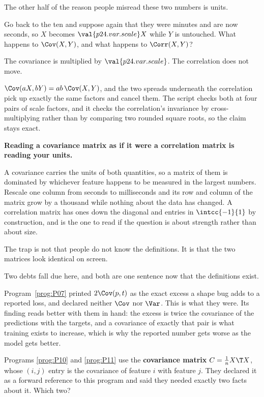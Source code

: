 \begin{fr}
The other half of the reason people misread these two numbers is units.

Go back to the ten and suppose again that they were minutes and are now
seconds, so $X$ becomes $\val{p24.var.scale}X$ while $Y$ is untouched. What
happens to $\Cov(X, Y)$, and what happens to $\Corr(X, Y)$?
\dotline
\nextframe
\end{fr}

\begin{fr}
\begin{ansblock}
The covariance is multiplied by $\val{p24.var.scale}$. The correlation does
not move.
\end{ansblock}

$\Cov(aX, bY) = ab\,\Cov(X, Y)$, and the two spreads underneath the
correlation pick up exactly the same factors and cancel them. The script
checks both at four pairs of scale factors, and it checks the correlation's
invariance by cross-multiplying rather than by comparing two rounded square
roots, so the claim stays exact.

\begin{trapbox}
\textbf{Reading a covariance matrix as if it were a correlation matrix is
reading your units.}

A covariance carries the units of both quantities, so a matrix of them is
dominated by whichever feature happens to be measured in the largest numbers.
Rescale one column from seconds to milliseconds and its row and column of the
matrix grow by a thousand while nothing about the data has changed. A
correlation matrix has ones down the diagonal and entries in
$\intcc{-1}{1}$ by construction, and is the one to read if the question is
about strength rather than about size.

The trap is not that people do not know the definitions. It is that the two
matrices look identical on screen.
\end{trapbox}
\end{fr}

\begin{fr}
Two debts fall due here, and both are one sentence now that the definitions
exist.

Program~\ref{prog:P07} printed $2\Cov(p, t)$ as the exact excess a shape bug
adds to a reported loss, and declared neither $\Cov$ nor $\Var$. This is what
they were. Its finding reads better with them in hand: the excess is twice the
covariance of the predictions with the targets, and a covariance of exactly
that pair is what training exists to increase, which is why the reported
number gets worse as the model gets better.

Programs \ref{prog:P10} and \ref{prog:P11} use the \textbf{covariance matrix}
$C = \frac{1}{n}X\T X$, whose $(i, j)$ entry is the covariance of feature $i$
with feature $j$. They declared it as a forward reference to this program and
said they needed exactly two facts about it. Which two?
\dotline
\nextframe
\end{fr}

